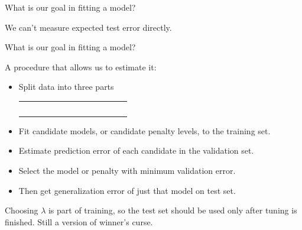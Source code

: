 \documentclass[xcolor={table}, handout]{beamer}
\begin{document}

\begin{frame}{What is our goal in fitting a model?}

\begin{wideitemize}
\item We can't measure expected test error directly. 
\end{wideitemize}

\end{frame}



\begin{frame}{What is our goal in fitting a model?}

\begin{wideitemize}
\item A procedure that allows us to estimate it:
\begin{itemize}
\item Split data into three parts
\begin{table}[]
\renewcommand{\arraystretch}{2.5}
\begin{tabular}{>{\centering\arraybackslash}p{5cm}|>{\centering\arraybackslash}p{2.5cm}|>{\centering\arraybackslash}p{2.5cm} }
\cellcolor{Contrast1l} \textcolor{white}{Training} & \cellcolor{Contrast4l} \textcolor{white}{Validation} & \cellcolor{Contrast6l} \textcolor{white}{Test} 
\end{tabular}
\end{table}
\pause
\item Fit candidate models, or candidate penalty levels, to the training set. \pause
\item Estimate prediction error of each candidate in the validation set. \pause
\item Select the model or penalty with minimum validation error.\pause
\item Then get generalization error of just that model on test set. \pause
\end{itemize}
\item Choosing $\lambda$ is part of training, so the test set should be used only after tuning is finished. \pause Still a version of winner's curse. 
\end{wideitemize}

\end{frame}
\end{document}
